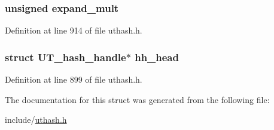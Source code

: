 \subsubsection[{\texorpdfstring{expand\+\_\+mult}{expand_mult}}]{\setlength{\rightskip}{0pt plus 5cm}unsigned expand\+\_\+mult}\hypertarget{struct_u_t__hash__bucket_a49a220a340de3b9ed14648a82472ab84}{}\label{struct_u_t__hash__bucket_a49a220a340de3b9ed14648a82472ab84}


Definition at line 914 of file uthash.\+h.

\subsubsection[{\texorpdfstring{hh\+\_\+head}{hh_head}}]{\setlength{\rightskip}{0pt plus 5cm}struct {\bf U\+T\+\_\+hash\+\_\+handle}$\ast$ hh\+\_\+head}\hypertarget{struct_u_t__hash__bucket_a32d33f384f3c99c1fd80202e1cd64c0c}{}\label{struct_u_t__hash__bucket_a32d33f384f3c99c1fd80202e1cd64c0c}


Definition at line 899 of file uthash.\+h.



The documentation for this struct was generated from the following file\+:\begin{DoxyCompactItemize}
\item 
include/\hyperlink{uthash_8h}{uthash.\+h}\end{DoxyCompactItemize}
